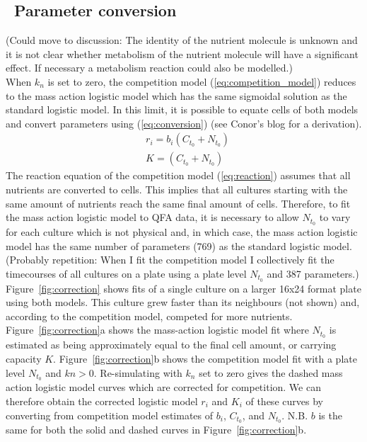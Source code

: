 


\subsection{\thesubsection~Parameter conversion}

(Could move to discussion: The identity of the
nutrient molecule is unknown and it is not clear whether metabolism of
the nutrient molecule will have a significant effect. If necessary a
metabolism reaction could also be modelled.)\\

When \(k_{n}\) is set to zero, the competition model
(\ref{eq:competition_model}) reduces to the mass action logistic model
which has the same sigmoidal solution as the standard logistic
model. In this limit, it is possible to equate cells of both models
and convert parameters using (\ref{eq:conversion}) (see Conor's blog
for a derivation).
\begin{subequations}
  \label{eq:conversion}
  \begin{align}
    &r_{i} = b_{i}(C_{t_{0}} + N_{t_{0}})\\
    &K = (C_{t_{0}} + N_{t_{0}})
  \end{align}
\end{subequations}
%
The reaction equation of the competition model (\ref{eq:reaction})
assumes that all nutrients are converted to cells. This implies that
all cultures starting with the same amount of nutrients reach the same
final amount of cells. Therefore, to fit the mass action logistic
model to QFA data, it is necessary to allow \(N_{t_{0}}\) to vary for
each culture which is not physical and, in which case, the mass action
logistic model has the same number of parameters (769) as the standard
logistic model. (Probably repetition: When I fit the competition model
I collectively fit the timecourses of all cultures on a plate using a
plate level \(N_{t_{0}}\) and 387 parameters.)
%
Figure~\ref{fig:correction} shows fits of a single culture on a larger
16x24 format plate using both models. This culture grew faster than
its neighbours (not shown) and, according to the competition model,
competed for more nutrients.
%
Figure~\ref{fig:correction}a shows the mass-action logistic model fit
where \(N_{t_{0}}\) is estimated as being approximately equal to the
final cell amount, or carrying capacity \(K\).
%
Figure~\ref{fig:correction}b shows the competition model fit with a
plate level \(N_{t_{0}}\) and \(kn > 0\). Re-simulating with \(k_{n}\)
set to zero gives the dashed mass action logistic model curves which
are corrected for competition. We can therefore obtain the corrected
logistic model \(r_{i}\) and \(K_{i}\) of these curves by converting
from competition model estimates of \(b_{i}\), \(C_{t_{0}}\), and
\(N_{t_{0}}\). N.B. \(b\) is the same for both the solid and dashed
curves in Figure~\ref{fig:correction}b.

